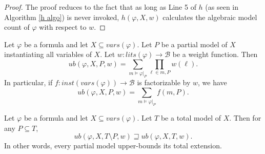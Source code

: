 \documentclass[acmsmall,review]{acmart}\settopmatter{printfolios=true,printccs=false,printacmref=false}
\begin{document}
\begin{proof}
  The proof reduces to the fact that as long as Line 5 of $h$ (as seen in Algorithm \ref{h algo}) is never invoked, $h(\varphi, X,w)$ calculates the algebraic model count of $\varphi$ with respect to $w$.
\end{proof}

\begin{corollary}\label{ub invariant for total models}
  Let $\varphi$ be a formula and let $X \subseteq vars(\varphi)$. Let $P$ be a partial model of $X$ instantiating all variables of $X$. Let $w : lits(\varphi) \to \mathcal B$ be a weight function. Then
  \begin{equation}
    ub(\varphi, X, P, w) = \sum_{m \models \varphi|_P} \prod_{\ell \in m, P} w(\ell).
  \end{equation}
  In particular, if $f : inst(vars(\varphi)) \to \mathcal B$ is factorizable by $w$, we have
  \begin{equation}
    ub(\varphi, X, P, w) = \sum_{m \models \varphi|_P} f(m,P).
  \end{equation}
\end{corollary}

\begin{lemma}\label{upper bounds pm}
  Let $\varphi$ be a formula and let $X \subseteq vars(\varphi)$. Let $T$ be a total model of $X$. Then for any $P \subseteq T$, 
  \begin{equation}
    ub(\varphi, X, T \setminus P, w) \sqsupseteq ub(\varphi, X , T,w).
  \end{equation}
  In other words, every partial model upper-bounds its total extension.
\end{lemma}
\end{document}
